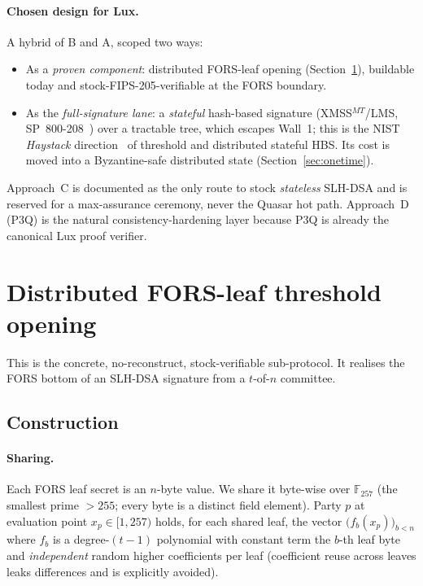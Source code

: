 \documentclass[11pt,a4paper]{article}
\newcommand{\GF}{\mathbb{F}}
\begin{document}
\paragraph{Chosen design for Lux.} A hybrid of B and A, scoped two ways:
\begin{itemize}[leftmargin=1.4em]
\item As a \emph{proven component}: distributed FORS-leaf opening
(Section~\ref{sec:fors}), buildable today and stock-FIPS-205-verifiable at the FORS
boundary.
\item As the \emph{full-signature lane}: a \emph{stateful} hash-based signature
(XMSS$^{MT}$/LMS, SP~800-208~\cite{sp800208}) over a tractable tree, which escapes
Wall~1; this is the NIST \emph{Haystack} direction~\cite{haystack} of threshold and
distributed stateful HBS. Its cost is moved into a Byzantine-safe distributed state
(Section~\ref{sec:onetime}).
\end{itemize}
Approach~C is documented as the only route to stock \emph{stateless} SLH-DSA and is
reserved for a max-assurance ceremony, never the Quasar hot path. Approach~D (P3Q)
is the natural consistency-hardening layer because P3Q is already the canonical Lux
proof verifier.

\section{Distributed FORS-leaf threshold opening}
\label{sec:fors}

This is the concrete, no-reconstruct, stock-verifiable sub-protocol. It realises the
FORS bottom of an SLH-DSA signature from a $t$-of-$n$ committee.

\subsection{Construction}
\label{sec:fors-construction}

\paragraph{Sharing.} Each FORS leaf secret is an $n$-byte value. We share it
byte-wise over $\GF_{257}$ (the smallest prime $> 255$; every byte is a distinct
field element). Party $p$ at evaluation point $x_p \in [1,257)$ holds, for each
shared leaf, the vector $\big(f_b(x_p)\big)_{b<n}$ where $f_b$ is a degree-$(t-1)$
polynomial with constant term the $b$-th leaf byte and \emph{independent} random
higher coefficients per leaf (coefficient reuse across leaves leaks differences and
is explicitly avoided).
\end{document}

